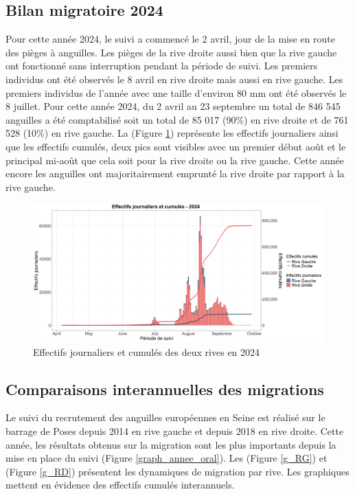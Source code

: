 \documentclass[11pt,titlepage,twoside]{article}\usepackage[]{graphicx}\usepackage[table]{xcolor}
\begin{document}
\subsection{Bilan migratoire 2024 }

Pour cette année 2024, le suivi a commencé le 2 avril, jour de la mise en route des pièges à anguilles. Les pièges de la rive droite aussi bien que la rive gauche ont fonctionné sans interruption pendant la période de suivi. Les premiers individus ont été observés le 8 avril en rive droite mais aussi en rive gauche. Les premiers individus de l’année avec une taille d’environ 80 mm ont été observés le 8 juillet. Pour cette année 2024, du 2 avril au 23 septembre un total de 846 545 anguilles a été comptabilisé soit un total de 85 017 (90\%) en rive droite et de 761 528 (10\%) en rive gauche. La (Figure \ref{graph_oral}) représente les effectifs journaliers ainsi que les effectifs cumulés, deux pics sont visibles avec un premier début août et le principal mi-août que cela soit pour la rive droite ou la rive gauche. Cette année encore les anguilles ont majoritairement emprunté la rive droite par rapport à la rive gauche.


\begin{figure}[htpb]
\centering
\includegraphics[width=\textwidth]{graph_oral.png}
\caption{Effectifs journaliers et cumulés des deux rives en 2024}
\label{graph_oral}
\end{figure}

\subsection{Comparaisons interannuelles des migrations}

Le suivi du recrutement des anguilles européennes en Seine est réalisé sur le barrage de Poses depuis 2014 en rive gauche et depuis 2018 en rive droite.  Cette année, les résultats obtenus sur la migration sont les plus importants depuis la mise en place du suivi (Figure \ref{graph_annee_oral}). Les (Figure \ref{g_RG}) et (Figure \ref{g_RD}) présentent les dynamiques de migration par rive. Les graphiques mettent en évidence des effectifs cumulés interannuels. 
\end{document}
